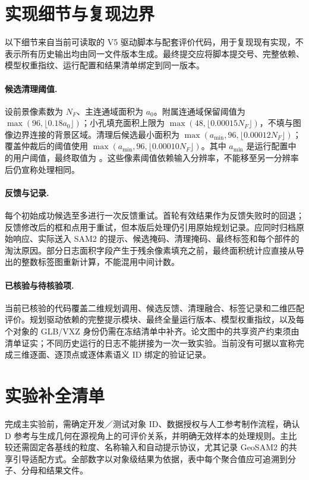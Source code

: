 \appendix
\section{实现细节与复现边界}
\label{app:implementation}
以下细节来自当前可读取的 V5 驱动脚本与配套评价代码，用于复现现有实现，不表示所有历史输出均由同一文件版本生成。最终提交应将脚本提交号、完整依赖、模型权重指纹、运行配置和结果清单绑定到同一版本。

\paragraph{候选清理阈值.}
设前景像素数为 $N_F$、主连通域面积为 $a_0$。附属连通域保留阈值为 $\max(96,\lfloor0.18a_0\rfloor)$；小孔填充面积上限为 $\max(48,\lfloor0.00015N_F\rfloor)$，不填与图像边界连接的背景区域。清理后候选最小面积为 $\max(a_{\min},96,\lfloor0.00012N_F\rfloor)$；覆盖仲裁后的阈值使用 $\max(a_{\min},96,\lfloor0.00010N_F\rfloor)$。其中 $a_{\min}$ 是运行配置中的用户阈值，最终取值为 。这些像素阈值依赖输入分辨率，不能移至另一分辨率后仍宣称处理相同。

\paragraph{反馈与记录.}
每个初始成功候选至多进行一次反馈重试。首轮有效结果作为反馈失败时的回退；反馈修改后的框和点用于重试，但本版后处理仍引用原始规划记录。应同时归档原始响应、实际送入 SAM2 的提示、候选掩码、清理掩码、最终标签和每个部件的淘汰原因。部分日志面积字段产生于残余像素填充之前，最终面积统计应直接从导出的整数标签图重新计算，不能混用中间计数。

\paragraph{已核验与待核验项.}
当前已核验的代码覆盖二维规划调用、候选反馈、清理融合、标签记录和二维匹配评价。规划驱动依赖的完整提示模块、最终全量运行版本、模型权重指纹，以及每个对象的 GLB/VXZ 身份仍需在冻结清单中补齐。论文图中的共享资产约束须由清单证实；不同历史运行的日志不能拼接为一次一致实验。当前没有可据以宣称完成三维逐面、逐顶点或逐体素语义 ID 绑定的验证记录。

\section{实验补全清单}
\label{app:pending}
完成主实验前，需确定开发／测试对象 ID、数据授权与人工参考制作流程，确认 D 参考与生成几何在源视角上的可评价关系，并明确无效样本的处理规则。主比较还需固定各基线的粒度、名称输入和自动提示协议，尤其记录 GeoSAM2 的共享引导适配方式。全部数字以对象级结果为依据，表中每个聚合值应可追溯到分子、分母和结果文件。

